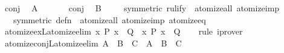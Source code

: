\begin{isabellebody}
\ conj\ \isamarkupfalse%
\ A\ \isacommand{{\isachardot}{\kern0pt}{\isachardot}{\kern0pt}}\isamarkupfalse%
\isanewline
\ \ \ \ \isamarkupfalse%
\ conj\ \isamarkupfalse%
\ B\ \isacommand{{\isachardot}{\kern0pt}{\isachardot}{\kern0pt}}\isamarkupfalse%
\isanewline
\ \ \isamarkupfalse%
\isanewline
{}\isamarkupfalse%
%
\endisatagproof
{\isafoldproof}%
%
\isadelimproof
\isanewline
%
\endisadelimproof
\isanewline
{}\isamarkupfalse%
\ {\isacharbrackleft}{\kern0pt}symmetric{\isacharcomma}{\kern0pt}\ rulify{\isacharbrackright}{\kern0pt}\ {\isacharequal}{\kern0pt}\ atomize{\isacharunderscore}{\kern0pt}all\ atomize{\isacharunderscore}{\kern0pt}imp\isanewline
\ \ \ {\isacharbrackleft}{\kern0pt}symmetric{\isacharcomma}{\kern0pt}\ defn{\isacharbrackright}{\kern0pt}\ {\isacharequal}{\kern0pt}\ atomize{\isacharunderscore}{\kern0pt}all\ atomize{\isacharunderscore}{\kern0pt}imp\ atomize{\isacharunderscore}{\kern0pt}eq%
\isadelimdocument
%
\endisadelimdocument
%
\isatagdocument
%
\isamarkuptrue%
%
\endisatagdocument
{\isafolddocument}%
%
\isadelimdocument
%
\endisadelimdocument
{}\isamarkupfalse%
\ atomize{\isacharunderscore}{\kern0pt}exL{\isacharbrackleft}{\kern0pt}atomize{\isacharunderscore}{\kern0pt}elim{\isacharbrackright}{\kern0pt}{\isacharcolon}{\kern0pt}\ {\isachardoublequoteopen}{\isacharparenleft}{\kern0pt}{\isasymAnd}x{\isachardot}{\kern0pt}\ P\ x\ {\isasymLongrightarrow}\ Q{\isacharparenright}{\kern0pt}\ {\isasymequiv}\ {\isacharparenleft}{\kern0pt}{\isacharparenleft}{\kern0pt}{\isasymexists}x{\isachardot}{\kern0pt}\ P\ x{\isacharparenright}{\kern0pt}\ {\isasymLongrightarrow}\ Q{\isacharparenright}{\kern0pt}{\isachardoublequoteclose}\isanewline
%
\isadelimproof
\ \ %
\endisadelimproof
%
\isatagproof
{}\isamarkupfalse%
\ rule\ iprover{\isacharplus}{\kern0pt}%
\endisatagproof
{\isafoldproof}%
%
\isadelimproof
\isanewline
%
\endisadelimproof
\isanewline
{}\isamarkupfalse%
\ atomize{\isacharunderscore}{\kern0pt}conjL{\isacharbrackleft}{\kern0pt}atomize{\isacharunderscore}{\kern0pt}elim{\isacharbrackright}{\kern0pt}{\isacharcolon}{\kern0pt}\ {\isachardoublequoteopen}{\isacharparenleft}{\kern0pt}A\ {\isasymLongrightarrow}\ B\ {\isasymLongrightarrow}\ C{\isacharparenright}{\kern0pt}\ {\isasymequiv}\ {\isacharparenleft}{\kern0pt}A\ {\isasymand}\ B\ {\isasymLongrightarrow}\ C{\isacharparenright}{\kern0pt}{\isachardoublequoteclose}\isanewline
%
\isadelimproof
\ \ %

\end{isabellebody}
